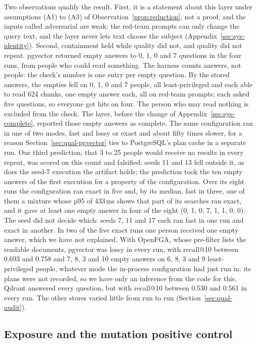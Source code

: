 Two observations qualify the result. First, it is a statement about this layer under assumptions
(A1) to (A3) of Observation~\ref{prop:reduction}, not a proof, and the inputs called adversarial are weak:
the red-team prompts can only change the query text, and the layer never lets text choose the
subject (Appendix~\ref{sec:sys-identity}). Second, containment held while quality did not, and quality
did not repeat. pgvector returned empty answers to 0, 1, 0 and 7 questions in the four
runs, from people who could read something. The harness counts answers, not people: the check's number is one entry per empty question. By the stored answers, the empties fell on 0, 1, 0 and 7 people, all least-privileged and each able to read 624 chunks, one empty answer each, all on red-team prompts; each asked five questions, so everyone got hits on four. The person who may read nothing is excluded from the check. The layer, before the change of
Appendix~\ref{sec:sys-complete}, reported those empty answers as complete. The same configuration ran
in one of two modes, fast and lossy or exact and about fifty times slower, for a reason
Section~\ref{sec:qual-pgvector} ties to PostgreSQL's plan cache in a separate run. Our third prediction, that 3 to 25
people would receive no results in every repeat, was scored on this count and falsified: seeds 11 and 13 fell outside it, as does
the seed-7 execution the artifact holds; the prediction took the ten empty answers of the first execution for a property of the configuration. Over its eight runs the
configuration ran exact in five and, by its median, fast in three, one of them a mixture whose p95 of
433\,ms shows that part of its searches ran exact, and it gave at least one empty answer in four of the eight (0, 1, 0, 7, 1, 1, 0, 0). The seed did not decide which: seeds 7, 11 and 17
each ran fast in one run and exact in another. In two of the five exact runs one person received one
empty answer, which we have not explained. With OpenFGA, whose pre-filter lists the readable documents,
pgvector was lossy in every run, with recall@10 between 0.693 and 0.758 and 7, 8, 3 and 10
empty answers on 6, 8, 3 and 9 least-privileged people, whatever mode the in-process configuration had just run
in; its plans were not recorded, so we have only an inference from the code for this. Qdrant answered every question, but with recall@10 between 0.530 and 0.561 in every run. The
other stores varied little from run to run (Section~\ref{sec:qual-audit}).

\subsection{Exposure and the mutation positive control}\label{app:e2e-control}

